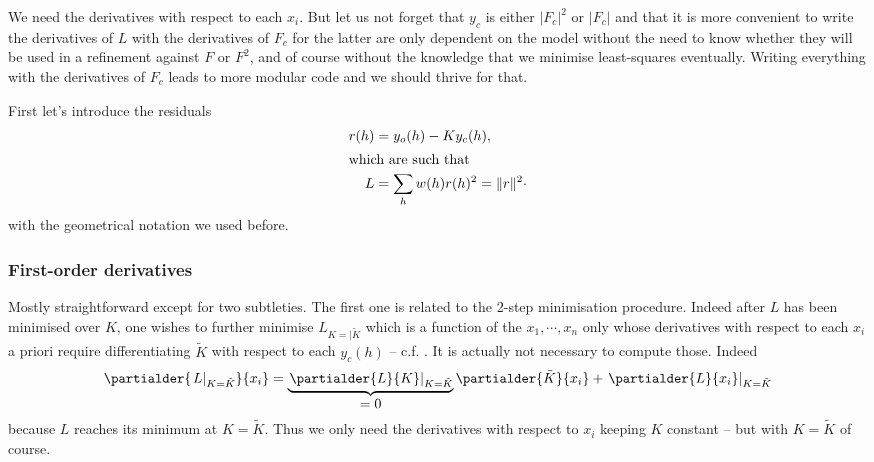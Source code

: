 \documentclass[11pt]{article}
\begin{document}
We need the derivatives with respect to each $x_i$. But let us not forget that $y_c$ is either $|F_c|^2$ or $|F_c|$ and that it is more convenient to write the derivatives of $L$ with the derivatives of $F_c$ for the latter are only dependent on the model without the need to know whether they will be used in a refinement against $F$ or $F^2$, and of course without the knowledge that we minimise least-squares eventually. Writing everything with the derivatives of $F_c$ leads to more modular code and we should thrive for that.

First let's introduce the residuals
\begin{align}
r(h) &= y_o(h) - K y_c(h),
\label{eqn:def:residual}\\
\intertext{which are such that}
L &= \sum_h w(h) r(h)^2 = \|r\|^2 \cdot
\label{eqn:L:vector}
\end{align}
with the geometrical notation we used before.

\subsubsection{First-order derivatives}
\label{lsq:mini:all:firstorder:derivatives}

Mostly straightforward except for two subtleties. The first one is related to the 2-step minimisation procedure. Indeed after $L$ has been minimised over $K$, one wishes to further minimise $L_{K=|\tilde{K}}$ which is a function of the $x_1, \cdots, x_n$ only whose derivatives with respect to each $x_i$ a priori require differentiating $\tilde{K}$ with respect to each $y_c(h)$ -- c.f. . It is actually not necessary to compute those. Indeed
\begin{equation}
\partialder{\left. L \right|_{K=\tilde{K}}}{x_i} = \underbrace{ \left.\partialder{L}{K}\right|_{K=\tilde{K}} }_{\displaystyle = 0} \partialder{\tilde{K}}{x_i} + \left.\partialder{L}{x_i}\right|_{K=\tilde{K}}
\label{eqn:twostep:firstorder:der}
\end{equation}
because $L$ reaches its minimum at $K=\tilde{K}$. Thus we only need the derivatives with respect to $x_i$ keeping $K$ constant -- but with $K=\tilde{K}$ of course.
\end{document}
